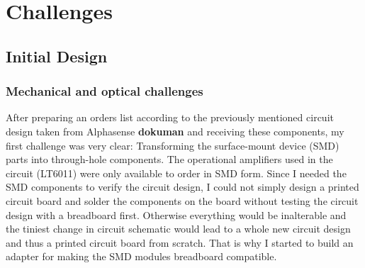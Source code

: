 \chapter{Challenges}
\label{sec:challenges}


\section{Initial Design}
\subsection{Mechanical and optical challenges}
\label{sub:mechanicalChallenges}

After preparing an orders list according to the previously mentioned circuit design taken from Alphasense \textbf{dokuman} and receiving these components, my first challenge was very clear: Transforming the surface-mount device (SMD) parts into through-hole components. The operational amplifiers used in the circuit (LT6011) were only available to order in SMD form. Since I needed the SMD components to verify the circuit design, I could not simply design a printed circuit board and solder the components on the board without testing the circuit design with a breadboard first. Otherwise everything would be inalterable and the tiniest change in circuit schematic would lead to a whole new circuit design and thus a printed circuit board from scratch. That is why I started to build an adapter for making the SMD modules breadboard compatible. \par 
